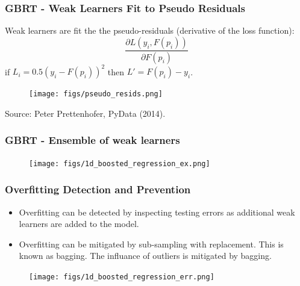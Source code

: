 \documentclass[t, pdftex]{beamer}
\begin{document}
\begin{frame}[noframenumbering]
\frametitle{GBRT - Weak Learners Fit to Pseudo Residuals}
Weak learners are fit the the pseudo-residuals (derivative of the loss function): 
\[
\frac{\partial L(y_i, F(p_i))}{\partial F(p_i)}
\]
if $L_i=0.5(y_i-F(p_i))^2$ then $L' = F(p_i)-y_i$.  
\begin{figure}[!htbp]
\centering
\texttt{[image: figs/pseudo\_resids.png]}
\label{model_overview}
\end{figure}
Source: Peter Prettenhofer, PyData (2014).
\end{frame}

\begin{frame}[noframenumbering]
\frametitle{GBRT - Ensemble of weak learners}

\begin{figure}[!htbp]
\centering
\texttt{[image: figs/1d\_boosted\_regression\_ex.png]}
\label{model_overview}
\end{figure}
\end{frame}

\begin{frame}[shrink=10]
\frametitle{Overfitting Detection and Prevention}
\begin{itemize}
\item Overfitting can be detected by inspecting testing errors as additional weak learners are added to the model.
\item Overfitting can be mitigated by sub-sampling with replacement.  This is known as bagging.  The influance of outliers is mitigated by bagging.
\end{itemize}
\begin{figure}[!htbp]
\centering
\texttt{[image: figs/1d\_boosted\_regression\_err.png]}
\label{model_overview}
\end{figure}
\end{frame}
\end{document}
